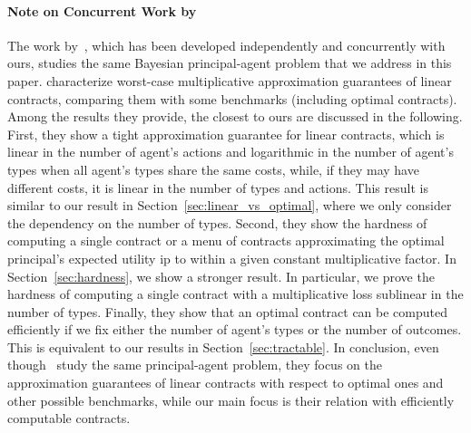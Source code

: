 \paragraph{Note on Concurrent Work by~\citet{guruganesh2020contracts}}
%
The work by~\citet{guruganesh2020contracts}, which has been developed independently and concurrently with ours, studies the same Bayesian principal-agent problem that we address in this paper.
%
\citet{guruganesh2020contracts} characterize worst-case multiplicative approximation guarantees of linear contracts, comparing them with some benchmarks (including optimal contracts).
%
Among the results they provide, the closest to ours are discussed in the following.
%
First, they show a tight approximation guarantee for linear contracts, which is linear in the number of agent's actions and logarithmic in the number of agent's types when all agent's types share the same costs, while, if they may have different costs, it is linear in the number of types and actions.
%
This result is similar to our result in Section~\ref{sec:linear_vs_optimal}, where we only consider the dependency on the number of types.
%
Second, they show the hardness of computing a single contract or a menu of contracts approximating the optimal principal's expected utility ip to within a given constant multiplicative factor.
%
In Section~\ref{sec:hardness}, we show a stronger result.
%
In particular, we prove the hardness of computing a single contract with a multiplicative loss sublinear in the number of types.
%
Finally, they show that an optimal contract can be computed efficiently if we fix either the number of agent’s types or the number of outcomes.
%
This is equivalent to our results in Section~\ref{sec:tractable}.
%
In conclusion, even though~\citet{guruganesh2020contracts} study the same principal-agent problem, they focus on the approximation guarantees of linear contracts with respect to optimal ones and other possible benchmarks, while our main focus is their relation with efficiently computable contracts.



